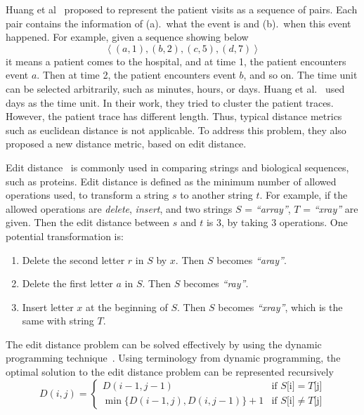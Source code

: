 Huang et al~\cite{huang2012anomaly} proposed to represent the patient visits as a sequence of pairs. Each pair contains the information of (a).~what the event is and (b).~when this event happened. For example, given a sequence showing below
$$
\left\langle(a, 1), (b, 2), (c, 5), (d, 7)\right\rangle 
$$
it means a patient comes to the hospital, and at time 1, the patient encounters event $a$. Then at time 2, the patient encounters event $b$, and so on. The time unit can be selected arbitrarily, such as minutes, hours, or days. Huang et al.~\cite{huang2012anomaly} used days as the time unit. In their work, they tried to cluster the patient traces. However, the patient trace has different length. Thus, typical distance metrics such as euclidean distance is not applicable. To address this problem, they also proposed a new distance metric, based on edit distance.

Edit distance~\cite{cormen2009introduction} is commonly used in comparing strings and biological sequences, such as proteins. Edit distance is defined as the minimum number of allowed operations used, to transform a string $s$ to another string $t$. For example, if the allowed operations are \textit{delete}, \textit{insert}, and two strings $S$ = \textit{``array''}, $T$ = \textit{``xray''} are given. Then the edit distance between $s$ and $t$ is 3, by taking 3 operations. One potential transformation is: 
\begin{enumerate}
	\item Delete the second letter $r$ in $S$ by $x$. Then $S$ becomes \textit{``aray''}.
	\item Delete the first letter $a$ in $S$. Then $S$ becomes \textit{``ray''}.
	\item Insert letter $x$ at the beginning of $S$. Then $S$ becomes \textit{``xray''}, which is the same with string $T$.
\end{enumerate}

The edit distance problem can be solved effectively by using the dynamic programming technique~\cite{cormen2009introduction}. Using terminology from dynamic programming, the optimal solution to the edit distance problem can be represented recursively
\begin{equation*}
D(i, j) = \begin{cases} 
   D(i-1, j-1) & \text{if } S\text{[i]} = T\text{[j]} \\
   \min\{D(i-1, j), D(i, j-1)\} + 1       & \text{if } S\text{[i]} \neq T\text{[j]}
  \end{cases}
\end{equation*}

